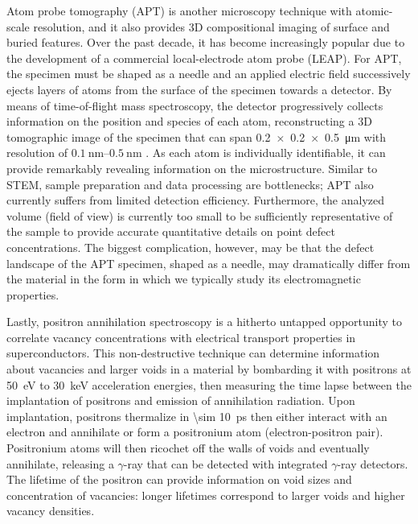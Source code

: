 \documentclass[%
 aip,
 amsmath,amssymb,
 reprint,%
floatfix]{revtex4-1}
\begin{document}
Atom probe tomography (APT) is another microscopy technique with atomic-scale resolution, and it also provides 3D compositional imaging of surface and buried features. Over the past decade, it has become increasingly popular due to the development of a commercial local-electrode atom probe (LEAP). For APT, the specimen must be shaped as a needle and an applied electric field successively ejects layers of atoms from the surface of the specimen towards a detector.  By means of time-of-flight mass spectroscopy, the detector progressively collects information on the position and species of each atom, reconstructing a 3D tomographic image of the specimen that can span \SI{0.2 x 0.2 x 0.5}{\micro\meter} with resolution of $\SIrange[range-phrase=-, range-units=single]{0.1}{0.5}{\nano\meter}$
\cite{Petersen2011}.  As each atom is individually identifiable, it can provide remarkably revealing information on the microstructure.  
Similar to STEM, sample preparation and data processing are bottlenecks; APT also currently suffers from limited detection efficiency\cite{Kelly2007}.  Furthermore, the analyzed volume (field of view) is currently too small to be sufficiently representative of the sample to provide accurate quantitative details on point defect concentrations.  The biggest complication, however, may be that the defect landscape of the APT specimen, shaped as a needle, may dramatically differ from the material in the form in which we typically study its electromagnetic properties. 



Lastly, positron annihilation spectroscopy is a hitherto untapped opportunity to correlate vacancy concentrations with electrical transport properties in superconductors. This non-destructive technique can determine information about vacancies and larger voids in a material by bombarding it with positrons at \SI{50}{\electronvolt} to \SI{30}{\kilo\electronvolt} acceleration energies,\cite{Gidley2006, Or2019} then measuring the time lapse between the implantation of positrons and emission of annihilation radiation. Upon implantation, positrons thermalize in \SI{\sim 10}{\pico\second} then either interact with an electron and annihilate or form a positronium atom (electron-positron pair)\cite{STRASKY2018455}.  Positronium atoms will then ricochet off the walls of voids and eventually annihilate, releasing a $\gamma$-ray that can be detected with integrated $\gamma$-ray detectors. The lifetime of the positron can provide information on void sizes and concentration of vacancies: longer lifetimes correspond to larger voids and higher vacancy densities. 
\end{document}
